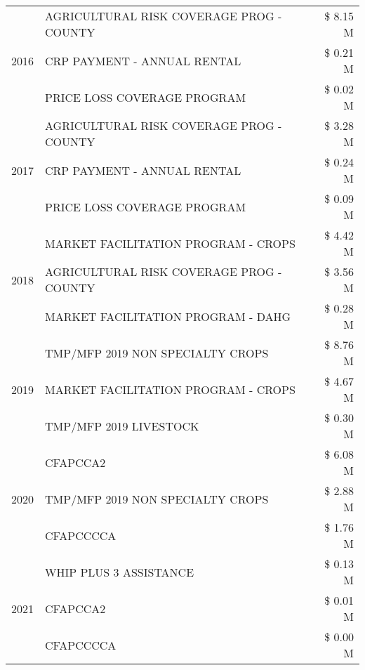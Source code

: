 \begin{tabular}{llr}
\cline{1-3}
\multirow[t]{3}{*}{2016} & AGRICULTURAL RISK COVERAGE PROG - COUNTY      & \$ 8.15 M \\
 & CRP PAYMENT - ANNUAL RENTAL                   & \$ 0.21 M \\
 & PRICE LOSS COVERAGE PROGRAM                   & \$ 0.02 M \\
\cline{1-3}
\multirow[t]{3}{*}{2017} & AGRICULTURAL RISK COVERAGE PROG - COUNTY & \$ 3.28 M \\
 & CRP PAYMENT - ANNUAL RENTAL & \$ 0.24 M \\
 & PRICE LOSS COVERAGE PROGRAM & \$ 0.09 M \\
\cline{1-3}
\multirow[t]{3}{*}{2018} & MARKET FACILITATION PROGRAM - CROPS & \$ 4.42 M \\
 & AGRICULTURAL RISK COVERAGE PROG - COUNTY & \$ 3.56 M \\
 & MARKET FACILITATION PROGRAM - DAHG & \$ 0.28 M \\
\cline{1-3}
\multirow[t]{3}{*}{2019} & TMP/MFP 2019 NON SPECIALTY CROPS & \$ 8.76 M \\
 & MARKET FACILITATION PROGRAM - CROPS & \$ 4.67 M \\
 & TMP/MFP 2019 LIVESTOCK & \$ 0.30 M \\
\cline{1-3}
\multirow[t]{3}{*}{2020} & CFAPCCA2 & \$ 6.08 M \\
 & TMP/MFP 2019 NON SPECIALTY CROPS & \$ 2.88 M \\
 & CFAPCCCCA & \$ 1.76 M \\
\cline{1-3}
\multirow[t]{3}{*}{2021} & WHIP PLUS 3 ASSISTANCE & \$ 0.13 M \\
 & CFAPCCA2 & \$ 0.01 M \\
 & CFAPCCCCA & \$ 0.00 M \\
\cline{1-3}
\bottomrule
\end{tabular}
